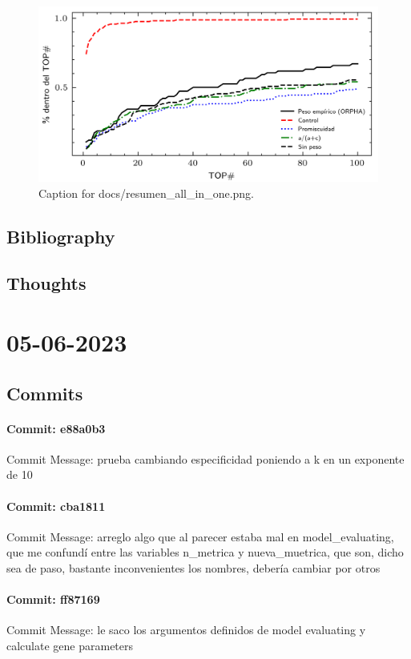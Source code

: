 \documentclass{article}
\begin{document}
\begin{figure}[h] \centering \includegraphics{docs/resumen_all_in_one.png} \caption{Caption for docs/resumen_all_in_one.png.} \end{figure}
\subsection{Bibliography}
\subsection{Thoughts}

\section{05-06-2023}
\subsection{Commits}
\paragraph{Commit: e88a0b3}
Commit Message: prueba cambiando especificidad poniendo a k en un exponente de 10

\paragraph{Commit: cba1811}
Commit Message: arreglo algo que al parecer estaba mal en model_evaluating, que me confundí entre las variables n_metrica y nueva_muetrica, que son, dicho sea de paso, bastante inconvenientes los nombres, debería cambiar por otros

\paragraph{Commit: ff87169}
Commit Message: le saco los argumentos definidos de model evaluating y calculate gene parameters
\end{document}
